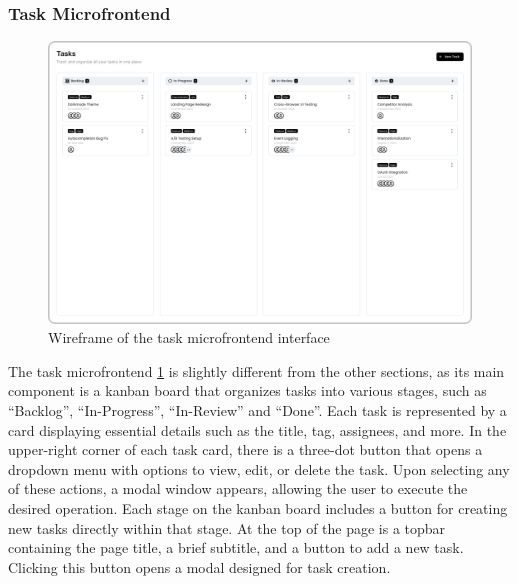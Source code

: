 \subsubsection*{Task Microfrontend}
\begin{figure}[h]
    \centerline{\includegraphics[width=1\textwidth]{images/wireframes/task-microfrontend.png}}
    \caption[Task microfrontend wireframe]{Wireframe of the task microfrontend interface}
    \label{fig:task-wireframe}
\end{figure}
The task microfrontend \ref{fig:task-wireframe} is slightly different from the other sections, as its main component is a kanban board that organizes tasks into various stages, such as ``Backlog'', ``In-Progress'', ``In-Review'' and ``Done''. Each task is represented by a card displaying essential details such as the title, tag, assignees, and more. In the upper-right corner of each task card, there is a three-dot button that opens a dropdown menu with options to view, edit, or delete the task. Upon selecting any of these actions, a modal window appears, allowing the user to execute the desired operation. Each stage on the kanban board includes a button for creating new tasks directly within that stage. At the top of the page is a topbar containing the page title, a brief subtitle, and a button to add a new task. Clicking this button opens a modal designed for task creation.

